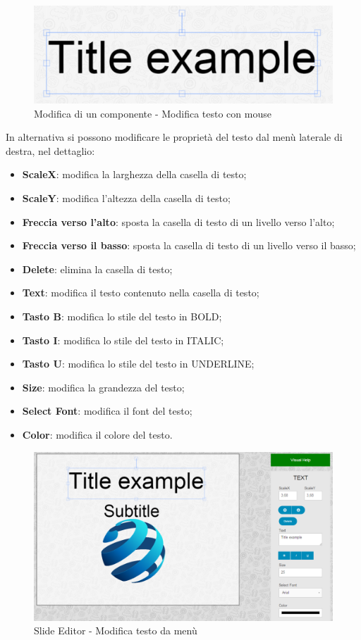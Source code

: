 \begin{figure}[H] 
	\centering 
	\includegraphics[scale=0.80] {img/text_anchor.png}
	\caption{Modifica di un componente - Modifica testo con mouse} 
\end{figure}

\noindent In alternativa si possono modificare le proprietà del testo dal menù laterale di destra, nel dettaglio:
		
		\begin{itemize}
			\item \textbf{ScaleX}: modifica la larghezza della casella di testo;
			\item \textbf{ScaleY}: modifica l'altezza della casella di testo;
			\item \textbf{Freccia verso l'alto}: sposta la casella di testo di un livello verso l'alto;
			\item \textbf{Freccia verso il basso}: sposta la casella di testo di un livello verso il basso;
			\item \textbf{Delete}: elimina la casella di testo;
			\item \textbf{Text}: modifica il testo contenuto nella casella di testo;
			\item \textbf{Tasto B}: modifica lo stile del testo in BOLD;
			\item \textbf{Tasto I}: modifica lo stile del testo in ITALIC;
			\item \textbf{Tasto U}: modifica lo stile del testo in UNDERLINE;
			\item \textbf{Size}: modifica la grandezza del testo;
			\item \textbf{Select Font}: modifica il font del testo;
			\item \textbf{Color}: modifica il colore del testo.
		\end{itemize}
		 \begin{figure}[h] 
		    \centering 
		    \includegraphics[scale=0.40] {img/text_edit.png}
		    \caption{Slide Editor - Modifica testo da menù} 
		\end{figure}
		
